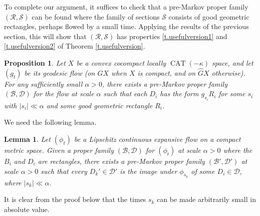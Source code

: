 \documentclass[JEP,XML,SOM,Unicode,NoFloatCountersInSection]{cedram}
\let\mathcal\mathscr
\newtheorem{lem}[thm]{Lemma}
\newtheorem{prop}[thm]{Proposition}
\theoremstyle{definition}
\numberwithin{equation}{section}
\DeclareMathOperator{\CAT}{CAT}
\newcommand\DDD{\mathcal D}
\newcommand\BBB{\mathcal B}
\newcommand\RRR{\mathcal R}
\newcommand\SSS{\mathcal S}
\begin{document}
To complete our argument, it suffices to check that a pre-Markov proper family $(\RRR, \SSS)$ can be found where the family of sections $\SSS$ consists of good geometric rectangles, perhaps flowed by a small time. Applying the results of the previous section, this will show that $(\RRR, \SSS)$ has properties \eqref{t.usefulversion1} and \eqref{t.usefulversion2} of Theorem \ref{t.usefulversion}.

\begin{prop}\label{prop:good mpf}
Let $X$ be a convex cocompact locally $\CAT(-\kappa)$ space, and let $(g_t)$ be its geodesic flow (on $GX$ when $X$ is compact, and on $\hat GX$ otherwise). For any sufficiently small $\alpha>0$, there exists a pre-Markov proper family $(\BBB, \DDD)$ for the flow at scale $\alpha$ such that each $D_i$ has the form $g_{s_i}R_i$ for some $s_i$ with $|s_i| \ll  \alpha$ and some good geometric rectangle $R_i$.
\end{prop}

We need the following lemma.

\begin{lem} \label{markovpf}
Let $(\phi_t)$ be a Lipschitz continuous expansive flow on a compact metric space. Given a proper family $(\BBB, \DDD)$ for $(\phi_t)$ at scale $\alpha>0$ where the $B_i$ and $D_i$ are rectangles, there exists a pre-Markov proper family $(\BBB', \DDD')$ at scale $\alpha>0$ such that every $D_k'\in\mathcal{D}'$ is the image under $\phi_{s_k}$ of some $D_i\in\mathcal{D}$, where $|s_k| \ll  \alpha$.
\end{lem}

It is clear from the proof below that the times $s_k$ can be made arbitrarily small in absolute value.
\end{document}

